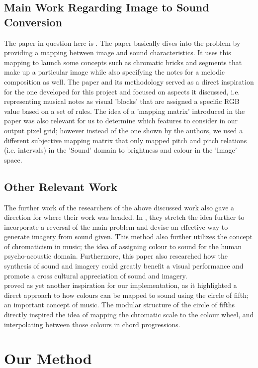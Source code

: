 \documentclass{article}
\begin{document}
\subsection{Main Work Regarding Image to Sound Conversion}
The paper in question here is \cite{margounakis2006converting}. The paper basically dives into the problem by providing a mapping between image and sound characteristics. It uses this mapping to launch some concepts such as chromatic bricks and segments that make up a particular image while also specifying the notes for a melodic composition as well. The paper and its methodology served as a direct inspiration for the one developed for this project and focused on aspects it discussed, i.e. representing musical notes as visual 'blocks' that are assigned a specific RGB value based on a set of rules. The idea of a 'mapping matrix' introduced in the paper was also relevant for us to determine which features to consider in our output pixel grid; however instead of the one shown by the authors, we used a different subjective mapping matrix that only mapped pitch and pitch relations (i.e. intervals) in the 'Sound' domain to brightness and colour in the 'Image' space.

\subsection{Other Relevant Work}
The further work of the researchers of the above discussed work also gave a direction for where their work was headed. In \cite{politis2008image}, they stretch the idea further to incorporate a reversal of the main problem and devise an effective way to generate imagery from sound given. This method also further utilizes the concept of chromaticism in music; the idea of assigning colour to sound for the human psycho-acoustic domain. Furthermore, this paper also researched how the synthesis of sound and imagery could greatly benefit a visual performance and promote a cross cultural appreciation of sound and imagery. \\

\cite{ciuha2010visualization} proved as yet another inspiration for our implementation, as it highlighted a direct approach to how colours can be mapped to sound using the circle of fifth; an important concept of music. The modular structure of the circle of fifths directly inspired the idea of mapping the chromatic scale to the colour wheel, and interpolating between those colours in chord progressions.

\section{Our Method}
\end{document}
